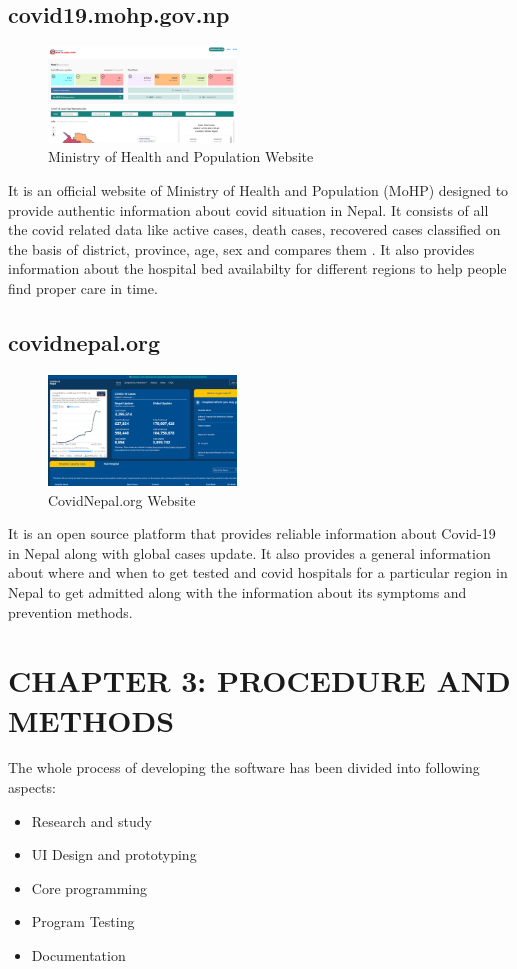 \documentclass{article}
\begin{document}
\subsection{covid19.mohp.gov.np}
\begin{figure}[h]
    \centerline{\includegraphics[width = 50mm]{mohp.png}}
    \caption{Ministry of Health and Population Website}
    \label{fig}
\end{figure}
It is an official website of Ministry of Health and Population (MoHP) designed to provide authentic information about covid situation in Nepal. It consists of all the covid related data like active cases, death cases, recovered cases classified on the basis of district, province, age, sex and compares them . It also provides information about the hospital bed availabilty for different regions to help people find proper care in time. 

\subsection{covidnepal.org}
\begin{figure}[h]
    \centerline{\includegraphics[width = 50mm]{covidnepal.png}}
    \caption{CovidNepal.org Website}
    \label{fig}
\end{figure}
It is an open source platform that provides reliable information about Covid-19 in Nepal along with global cases update. It also provides a general information about where and when to get tested and covid hospitals for a particular region in Nepal to get admitted along with the information about its symptoms and prevention methods. 
\clearpage

\section{CHAPTER 3: PROCEDURE AND METHODS}
The whole process of developing the software has been divided into following aspects:
\begin{itemize}
    \item Research and study
    \item UI Design and prototyping
    \item Core programming
    \item Program Testing
    \item Documentation
\end{itemize}
\end{document}
